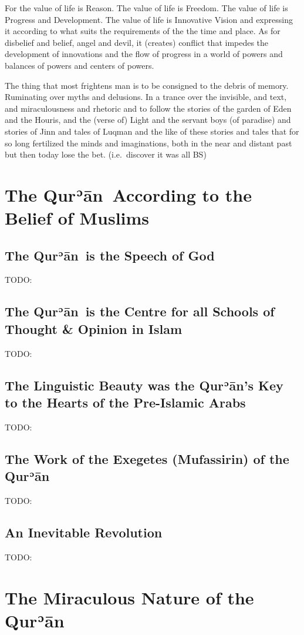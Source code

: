 \documentclass[12pt]{memoir}
\def\´{ʾ} %
\def \Quran{Qur\-\´ān} %
\begin{document}
For the value of life is Reason. The value of life is Freedom. The value of
life is Progress and Development. The value of life is Innovative Vision and
expressing it according to what suits the requirements of the the time and
place. As for disbelief and belief, angel and devil, it (creates) conflict that
impedes the development of innovations and the flow of progress in a world of
powers and balances of powers and centers of powers.

The thing that most frightens man is to be consigned to the debris of memory.
Ruminating over myths and delusions. In a trance over the invisible, and text,
and miraculousness and rhetoric and to follow the stories of the garden of Eden
and the Houris, and the (verse of) Light and the servant boys (of paradise) and
stories of Jinn and tales of Luqman and the like of these stories and tales
that for so long fertilized the minds and imaginations, both in the near and
distant past but then today lose the bet. (i.e.\ discover it was all BS)


\chapter{The \Quran\ According to the Belief of Muslims}

\section{The \Quran\ is the Speech of God}
TODO:
\section{The \Quran\ is the Centre for all
Schools of Thought \& Opinion in Islam}
TODO:
\section{The Linguistic Beauty was the \Quran’s Key
to the Hearts of the Pre-Islamic Arabs}
TODO:
\section[The Work of the Exegetes of the \Quran]
{The Work of the Exegetes (Mufassirin) of the \Quran}
TODO:
\section{An Inevitable Revolution}
TODO:

\chapter{The Miraculous Nature of the \Quran}
\end{document}
